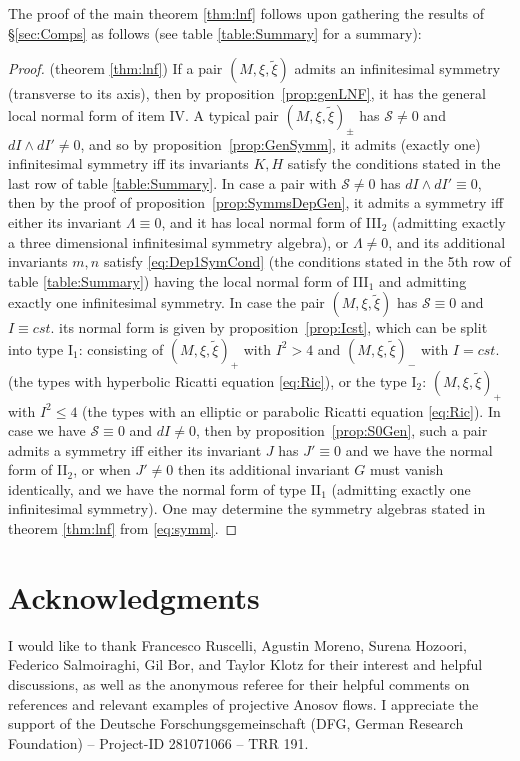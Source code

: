 \documentclass[10pt]{amsart}
\theoremstyle{definition}
\begin{document}
The proof of the main theorem \ref{thm:lnf} follows upon gathering the results of \S \ref{sec:Comps} as follows (see table \ref{table:Summary} for a summary):
\begin{proof}(theorem \ref{thm:lnf}) If a pair $(M, \xi, \tilde \xi)$ admits an infinitesimal symmetry (transverse to its axis), then by proposition~\ref{prop:genLNF}, it has the general local normal form of item IV.  A typical pair $(M, \xi, \tilde \xi)_\pm$ has $\mathcal{S}\ne 0$ and $dI\wedge dI'\ne 0$, and so by proposition~\ref{prop:GenSymm}, it admits (exactly one) infinitesimal symmetry iff its invariants $K,H$ satisfy the conditions stated in the last row of table \ref{table:Summary}. In case a pair with $\mathcal{S}\ne 0$ has $dI\wedge dI'\equiv 0$, then by the proof of proposition~\ref{prop:SymmsDepGen}, it admits a symmetry iff either its invariant $\Lambda\equiv 0$, and it has local normal form of III$_2$ (admitting exactly a three dimensional infinitesimal symmetry algebra), or $\Lambda\ne 0$, and its additional invariants $m,n$ satisfy \eqref{eq:Dep1SymCond} (the conditions stated in the 5th row of table \ref{table:Summary}) having the local normal form of III$_1$ and admitting exactly one infinitesimal symmetry. In case the pair $(M, \xi, \tilde \xi)$ has $\mathcal{S}\equiv 0$ and $I\equiv cst.$ its normal form is given by proposition~\ref{prop:Icst}, which can be split into type I$_1$:  consisting of $(M, \xi, \tilde \xi)_+$ with $I^2 >4$ and $(M, \xi, \tilde \xi)_-$ with $I = cst.$ (the types with hyperbolic Ricatti equation \eqref{eq:Ric}), or the type I$_2$: $(M, \xi, \tilde \xi)_+$ with $I^2 \le 4$ (the types with an elliptic or parabolic Ricatti equation \eqref{eq:Ric}). In case we have $\mathcal{S}\equiv 0$ and $dI\ne 0$, then by proposition~\ref{prop:S0Gen}, such a pair admits a symmetry iff either its invariant $J$ has $J'\equiv 0$ and we have the normal form of II$_2$, or when $J'\ne 0$ then its additional invariant $G$ must vanish identically, and we have the normal form of type II$_1$ (admitting exactly one infinitesimal symmetry). One may determine the symmetry algebras stated in theorem \ref{thm:lnf} from \eqref{eq:symm}.
\end{proof}

   
\section*{Acknowledgments}

I would like to thank Francesco Ruscelli, Agustin Moreno, Surena Hozoori, Federico Salmoiraghi, Gil Bor, and Taylor Klotz for their interest and helpful discussions, as well as the anonymous referee for their helpful comments on references and relevant examples of projective Anosov flows. I appreciate the support of the Deutsche Forschungsgemeinschaft (DFG, German Research Foundation) – Project-ID 281071066 – TRR 191.
\end{document}
